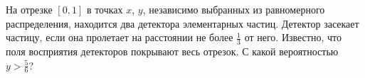 \documentclass{article}
\begin{document}
На отрезке $[0,1]$ в точках $x$, $y$, независимо выбранных из равномерного распределения, находится два детектора элементарных частиц. Детектор засекает частицу, если она пролетает на расстоянии не более $\frac{1}{3}$ от него. Известно, что поля восприятия детекторов покрывают весь отрезок. С какой вероятностью $y > \frac{5}{6}$?
\end{document}
